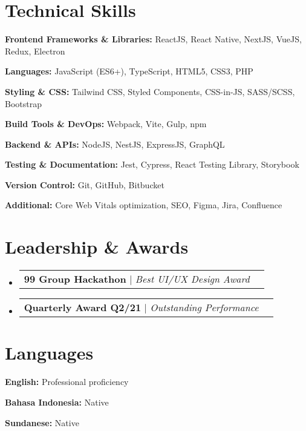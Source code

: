 \documentclass[a4paper, 11pt]{article}
\makeatletter
\newcommand{\resumeProjectHeading}[2]{
    \item
    \begin{tabular*}{0.987\textwidth}{l@{\extracolsep{\fill}}r}
      \small#1\\
    \end{tabular*}\vspace{-7pt}
}
\newcommand{\resumeSubHeadingListStart}{\begin{itemize}[leftmargin=0.1in, label={}]}
\newcommand{\resumeSubHeadingListEnd}{\end{itemize}\vspace{5pt}}
\makeatother
\begin{document}
\section{Technical Skills}
    \resumeSubHeadingListStart
        \small{
            \item \textbf{Frontend Frameworks \& Libraries:} ReactJS, React Native, NextJS, VueJS, Redux, Electron
            \item \textbf{Languages:} JavaScript (ES6+), TypeScript, HTML5, CSS3, PHP
            \item \textbf{Styling \& CSS:} Tailwind CSS, Styled Components, CSS-in-JS, SASS/SCSS, Bootstrap
            \item \textbf{Build Tools \& DevOps:} Webpack, Vite, Gulp, npm
            \item \textbf{Backend \& APIs:} NodeJS, NestJS, ExpressJS, GraphQL
            \item \textbf{Testing \& Documentation:} Jest, Cypress, React Testing Library, Storybook
            \item \textbf{Version Control:} Git, GitHub, Bitbucket
            \item \textbf{Additional:} Core Web Vitals optimization, SEO, Figma, Jira, Confluence
        }
    \resumeSubHeadingListEnd

\section{Leadership \& Awards}
    \resumeSubHeadingListStart
        \resumeProjectHeading
            {\textbf{99 Group Hackathon} $|$ \emph{Best UI/UX Design Award}}{2021}
        \resumeProjectHeading
            {\textbf{Quarterly Award Q2/21} $|$ \emph{Outstanding Performance}}{2021}
    \resumeSubHeadingListEnd

\section{Languages}
    \resumeSubHeadingListStart
        \small{
            \item \textbf{English:} Professional proficiency
            \item \textbf{Bahasa Indonesia:} Native
            \item \textbf{Sundanese:} Native
        }
    \resumeSubHeadingListEnd
\end{document}
